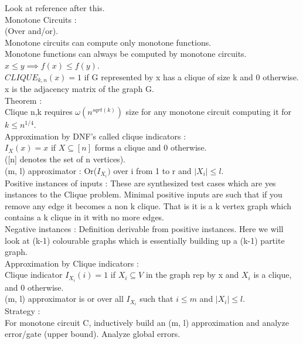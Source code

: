 \documentclass[solution,addpoints,12pt]{exam}
\begin{document}
Look at reference after this.\\

Monotone Circuits :\\
(Over and/or).\\
Monotone circuits can compute only monotone functions.\\
Monotone functions can always be computed by monotone circuits.\\
$x \le y \implies f(x) \le f(y)$.\\
$CLIQUE_{k, n}(x) = 1$ if G represented by x has a clique of size k
and 0 otherwise.\\
x is the adjacency matrix of the graph G.\\
Theorem :\\
Clique n,k requires $\omega(n^{sqrt(k)})$ size for any
monotone circuit computing it for $k \le n^{1/4}$.\\
Approximation by DNF's called clique indicators :\\
$I_X(x) = x$ if $X \subseteq [n]$ forms a clique and 0 otherwise.\\
([n] denotes the set of n vertices).\\
(m, l) approximator : Or($I_{X_i})$ over i from 1 to r
and $|X_i| \le l$.\\

Positive instances of inputs : These
are synthesized test cases which are yes instances to the
Clique problem. Minimal positive inputs are such that
if you remove any edge it becomes a non k clique. That is
it is a k vertex graph which contains a k clique in it
with no more edges.\\

Negative instances : Definition derivable from positive instances.
Here we will look at (k-1) colourable graphs which is
essentially building up a (k-1) partite graph.\\



Approximation by Clique indicators :\\
Clique indicator $I_{X_i}(i) = 1$ if $X_i \subseteq V$ in the graph rep by x and $X_i$ is
a clique,
and 0 otherwise.\\
(m, l) approximator is or over all $I_{X_i}$ such that $i \le m$ and $|X_i| \le l$.\\

Strategy :\\

For monotone circuit C, inductively build an (m, l) approximation
and analyze error/gate (upper bound). Analyze global errors.\\
\end{document}
